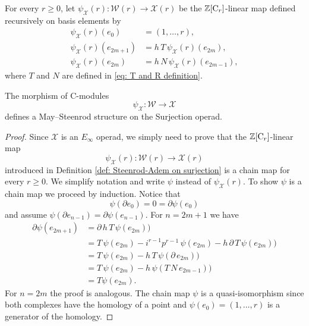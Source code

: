 \begin{definition} \label{def: Steenrod-Adem on surjection}
	For every $r \geq 0$, let $\psi_{\mathcal X}(r) \colon \mathcal W(r) \to \mathcal X(r)$ be the $\mathbb{Z}[\mathrm{C}_r]$-linear map defined recursively on basis elements by
	\begin{align*}
	\psi_{\mathcal X}(r)(e_0) & = (1, \dots, r), \\
	\psi_{\mathcal X}(r)(e_{2m+1}) & = h\,T\,\psi_{\mathcal X}(r)(e_{2m}), \\
	\psi_{\mathcal X}(r)(e_{2m}) & = h\,N\,\psi_{\mathcal X}(r)(e_{2m-1}),
	\end{align*}
	where $T$ and $N$ are defined in \eqref{eq: T and R definition}.
\end{definition}

\begin{theorem} \label{thm: Steenrod-Adem on surjection MS convention}
	The morphism of $\mathrm{C}$-modules
	\begin{equation*}
	\psi_{\mathcal X} \colon \mathcal W \to \mathcal X
	\end{equation*}
	defines a May--Steenrod structure on the Surjection operad.
\end{theorem}

\begin{proof}
	Since $\mathcal X$ is an $E_\infty$ operad, we simply need to prove that the $\mathbb{Z}[\mathrm{C}_r]$-linear map
	\begin{equation*}
	\psi_{\mathcal X}(r) \colon \mathcal W(r) \to \mathcal X(r)
	\end{equation*}
	introduced in Definition \ref{def: Steenrod-Adem on surjection} is a chain map for every $r \geq 0$. We simplify notation and write $\psi$ instead of $\psi_{\mathcal X}(r)$. To show $\psi$ is a chain map we proceed by induction. Notice that
	\begin{equation*}
	\psi(\partial e_0) = 0 = \partial \psi(e_0)
	\end{equation*}
	and assume $\psi(\partial e_{n-1}) = \partial \psi(e_{n-1})$. For $n = 2m+1$ we have
	\begin{align*}
	\partial \psi(e_{2m+1}) 
	& =
	\partial\, h\, T\, \psi(e_{2m}) \big) \\
	& =
	T\, \psi(e_{2m}) - i^{r-1} p^{r-1}\, \psi(e_{2m}) -
	h\, \partial\, T\, \psi(e_{2m}) \big) \\
	& =
	T\, \psi(e_{2m}) - 
	h\, T\, \psi(\partial\, e_{2m}) \big) \\
	& =
	T\, \psi(e_{2m}) - 
	h\, \psi(T\,N\, e_{2m-1}) \big) \\
	& = 
	T \psi(e_{2m}).
	\end{align*}
	For $n = 2m$ the proof is analogous. The chain map $\psi$ is a quasi-isomorphism since both complexes have the homology of a point and $\psi(e_0) = (1, \dots, r)$ is a generator of the homology.
\end{proof}

